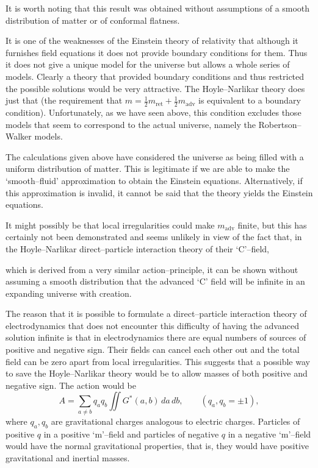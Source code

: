 \medskip

It is worth noting that this result was obtained without 
assumptions of a smooth distribution of matter or of conformal flatness.

It is one of the weaknesses of the Einstein theory of 
relativity that although it furnishes field equations it does 
not provide boundary conditions for them. Thus it does not 
give a unique model for the universe but allows a whole series 
of models. Clearly a theory that provided boundary conditions 
and thus restricted the possible solutions would be very 
attractive. The Hoyle--Narlikar theory does just that (the 
requirement that \( m = \tfrac{1}{2} m_{\text{ret}} + \tfrac{1}{2} m_{\text{adv}} \) 
is equivalent to a boundary condition). Unfortunately, as we 
have seen above, this condition excludes those models that 
seem to correspond to the actual universe, namely the 
Robertson--Walker models.

\medskip

The calculations given above have considered the universe 
as being filled with a uniform distribution of matter. This 
is legitimate if we are able to make the `smooth--fluid' 
approximation to obtain the Einstein equations. Alternatively, 
if this approximation is invalid, it cannot be said that the 
theory yields the Einstein equations.

\medskip

It might possibly be that local irregularities could make 
\(m_{\text{adv}}\) finite, but this has certainly not been demonstrated 
and seems unlikely in view of the fact that, in the Hoyle--Narlikar 
direct--particle interaction theory of their `C'--field,

which is derived from a very similar action--principle, it can 
be shown without assuming a smooth distribution that the 
advanced `C' field will be infinite in an expanding universe 
with creation.

\medskip

The reason that it is possible to formulate a direct--particle 
interaction theory of electrodynamics that does not encounter 
this difficulty of having the advanced solution infinite is 
that in electrodynamics there are equal numbers of sources 
of positive and negative sign. Their fields can cancel each 
other out and the total field can be zero apart from local 
irregularities. This suggests that a possible way to save the 
Hoyle--Narlikar theory would be to allow masses of both positive 
and negative sign. The action would be
\[
A = \sum_{a \ne b} q_{a} q_{b} \iint G^{*}(a,b)\, da\, db, 
\qquad (q_{a}, q_{b} = \pm 1),
\]
where \(q_{a}, q_{b}\) are gravitational charges analogous to 
electric charges. Particles of positive \(q\) in a positive 
`m'--field and particles of negative \(q\) in a negative 
`m'--field would have the normal gravitational properties, 
that is, they would have positive gravitational and inertial masses.

